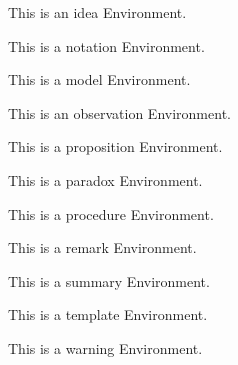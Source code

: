 \documentclass{ximera}
\begin{document}
        \begin{idea}
            This is an idea Environment.
        \end{idea}%
        \begin{notation}
            This is a notation Environment.
        \end{notation}%
        \begin{model}
            This is a model Environment.
        \end{model}%
        \begin{observation}
            This is an observation Environment.
        \end{observation}%
        \begin{proposition}
            This is a proposition Environment.
        \end{proposition}%
        \begin{paradox}
            This is a paradox Environment.
        \end{paradox}%
        \begin{procedure}
            This is a procedure Environment.
        \end{procedure}%
        \begin{remark}
            This is a remark Environment.
        \end{remark}%
        \begin{summary}
            This is a summary Environment.
        \end{summary}%
        \begin{template}
            This is a template Environment.
        \end{template}%
        \begin{warning}
            This is a warning Environment.
        \end{warning}%
\end{document}
